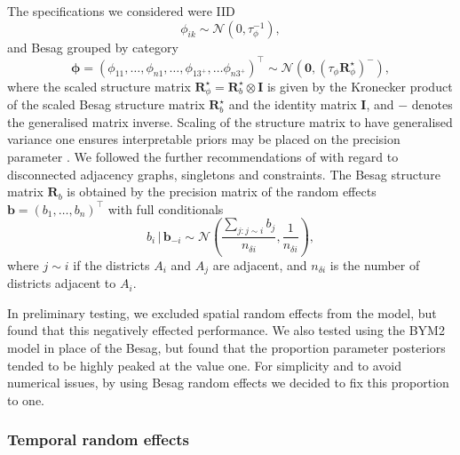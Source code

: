 \documentclass[a4paper, nobind]{templates/ociamthesis}
\newcommand{\N}{\mathcal{N}}
\newcommand{\bphi}{\bm{\phi}}
\begin{document}
The specifications we considered were IID
\[
\phi_{ik} \sim \mathcal{N}(0, \tau_\phi^{-1}),
\]
and Besag grouped by category
\[
\bphi = (\phi_{11}, \ldots, \phi_{n1}, \ldots, \phi_{1{3^{+}}}, \ldots \phi_{n3^{+}})^\top \sim \mathcal{N}(\mathbf{0}, (\tau_\phi \mathbf{R}^\star_\phi)^{-}),
\]
where the scaled structure matrix \(\mathbf{R}^\star_\phi = \mathbf{R}^\star_b \otimes \mathbf{I}\) is given by the Kronecker product of the scaled Besag structure matrix \(\mathbf{R}^\star_b\) and the identity matrix \(\mathbf{I}\), and \({-}\) denotes the generalised matrix inverse.
Scaling of the structure matrix to have generalised variance one ensures interpretable priors may be placed on the precision parameter \autocite{sorbye2014scaling}.
We followed the further recommendations of \textcite{freni2018note} with regard to disconnected adjacency graphs, singletons and constraints.
The Besag structure matrix \(\mathbf{R}_b\) is obtained by the precision matrix of the random effects \(\mathbf{b} = (b_1, \ldots, b_n)^\top\) with full conditionals
\begin{equation}
b_i \, | \, \mathbf{b}_{-i} \sim \N\left(\frac{\sum_{j: j \sim i} b_j}{n_{\delta i}}, \frac{1}{n_{\delta i}}\right),
\end{equation}
where \(j \sim i\) if the districts \(A_i\) and \(A_j\) are adjacent, and \(n_{\delta i}\) is the number of districts adjacent to \(A_i\).

In preliminary testing, we excluded spatial random effects from the model, but found that this negatively effected performance.
We also tested using the BYM2 model \autocite{simpson2017penalising} in place of the Besag, but found that the proportion parameter posteriors tended to be highly peaked at the value one.
For simplicity and to avoid numerical issues, by using Besag random effects we decided to fix this proportion to one.

\hypertarget{temporal-random-effects}{%
\subsubsection{Temporal random effects}\label{temporal-random-effects}}
\end{document}
